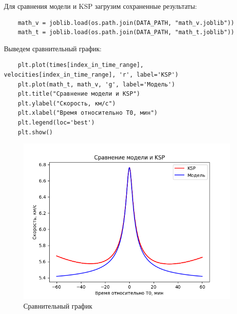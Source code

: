 \documentclass{article}
\begin{document}
    Для сравнения модели и KSP загрузим сохраненные результаты:
    \begin{verbatim}
    math_v = joblib.load(os.path.join(DATA_PATH, "math_v.joblib"))
    math_t = joblib.load(os.path.join(DATA_PATH, "math_t.joblib"))
    \end{verbatim}
    Выведем сравнительный график:
    \begin{verbatim}
    plt.plot(times[index_in_time_range], velocities[index_in_time_range], 'r', label='KSP')
    plt.plot(math_t, math_v, 'g', label='Модель')
    plt.title("Сравнение модели и KSP")
    plt.ylabel("Скорость, км/с")
    plt.xlabel("Время относительно T0, мин")
    plt.legend(loc='best')
    plt.show()
    \end{verbatim}
    \begin{figure}[H]
        \centering
        \includegraphics[width=0.75\linewidth]{images/compare_ksp_math.png}
        \caption{Сравнительный график}
        \label{fig:compare}
    \end{figure}
    
\end{document}
